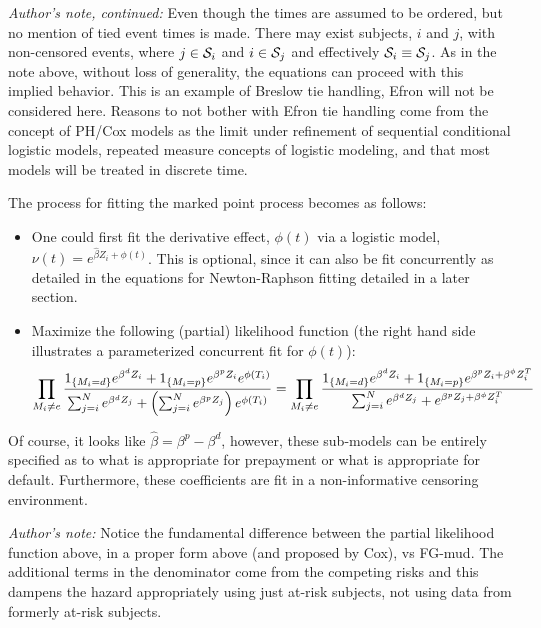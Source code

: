 \documentclass[10pt]{article}
\begin{document}
{\em Author's note, continued:}
Even though the times are assumed to be ordered, but no mention of tied event times is made.
There may exist subjects, $i$ and $j$, with non-censored events, where  $j \in {\cal S}_i$ and $i \in {\cal S}_j$ and effectively ${\cal
S}_i \equiv {\cal S}_j$.
As in the note above, without loss of generality, the equations can proceed with this implied behavior.
This is an example of Breslow tie handling, Efron will not be considered here. 
Reasons to not bother with Efron tie handling come from the concept of PH/Cox models as 
the limit under refinement
of sequential conditional logistic models, repeated measure concepts of logistic modeling, and that 
most models will be treated in discrete time.

The process for fitting the marked point process becomes as follows:
\begin{itemize}
    \item One could first fit the derivative effect, $\phi(t)$ via a logistic model, $\nu(t)=e^{\hat{\beta}Z_i+\phi(t)}$.  
        This is optional, since it can also be fit concurrently as detailed in the equations for Newton-Raphson fitting detailed in a later
        section.

    \item Maximize the following (partial) likelihood function (the right hand side illustrates a parameterized concurrent fit for
        $\phi(t)$):
$$\prod_{M_i \not = e} {{1_{\{M_i=d\}}e^{\beta^d Z_i}+1_{\{M_i=p\}}e^{\beta^p Z_i}e^{\phi(T_i)} }
\over { \sum_{j=i}^N e^{\beta^d Z_j}+\left({\sum_{j=i}^N e^{\beta^p Z_j}}\right)e^{\phi(T_i)} } } =
        \prod_{M_i \not = e} {{1_{\{M_i=d\}}e^{\beta^d Z_i}+1_{\{M_i=p\}}e^{\beta^p Z_i + \beta^\phi Z^T_i} }
        \over { \sum_{j=i}^N e^{\beta^d Z_j} + e^{\beta^p Z_j + \beta^\phi Z^T_i} } } $$
\end{itemize}

Of course, it looks like $\hat{\beta}=\beta^p-\beta^d$, however, these sub-models can be entirely specified as to what is appropriate for prepayment or what is
appropriate for default. Furthermore, these coefficients are fit in a non-informative censoring environment.

{\em Author's note:} Notice the fundamental difference between the partial likelihood function above, in a proper form above (and proposed
by Cox), vs FG-mud.
The additional terms in the denominator come from the competing risks and this dampens the hazard appropriately using just at-risk subjects,
not using data from formerly at-risk subjects.
\end{document}
